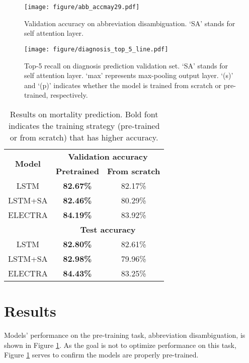 \documentclass[11pt,a4paper]{article}
\begin{document}
\begin{figure}[t]
    \centering
    \texttt{[image: figure/abb\_accmay29.pdf]}
    \caption{Validation accuracy on abbreviation disambiguation. `SA' stands for self attention layer.}
    \label{fig:abb-acc}
\end{figure}

\begin{figure}[tp]
    \centering
    \texttt{[image: figure/diagnosis\_top\_5\_line.pdf]}
    \caption{Top-5 recall on diagnosis prediction validation set. `SA' stands for self attention layer. `max' represents max-pooling output layer. `(s)' and `(p)' indicates whether the model is trained from scratch or pre-trained, respectively.}
    \label{fig:top-5-line}
\end{figure}

\begin{table}[t]
\centering
\begin{threeparttable}
\begin{tabular}{|c|c|c|}
\hline
\multirow{2}{*}{\textbf{Model}} & \multicolumn{2}{c|}{\textbf{Validation accuracy}} \\ \cline{2-3} 
 & \textbf{Pretrained} & \textbf{From scratch} \\ \hline
LSTM & \textbf{82.67\%} & 82.17\% \\ \hline
LSTM+SA & \textbf{82.46\%} & 80.29\% \\ \hline
ELECTRA & \textbf{84.19\%} & 83.92\% \\ \hline
& \multicolumn{2}{c|}{\textbf{Test accuracy}} \\ \hline
LSTM & \textbf{82.80\%} & 82.61\% \\ \hline
LSTM+SA & \textbf{82.98\%} & 79.96\% \\ \hline
ELECTRA & \textbf{84.43\%} & 83.25\% \\ \hline
\end{tabular}
\caption{Results on mortality prediction. Bold font indicates the training strategy (pre-trained or from scratch) that has higher accuracy.}
\label{tab:mor-acc}
\end{threeparttable}
\end{table}

\section{Results}\label{s:exps}

Models' performance on the pre-training task, abbreviation disambiguation, is shown in Figure \ref{fig:abb-acc}. As the goal is not to optimize performance on this task, Figure \ref{fig:abb-acc} serves to confirm the models are properly pre-trained.
\end{document}
